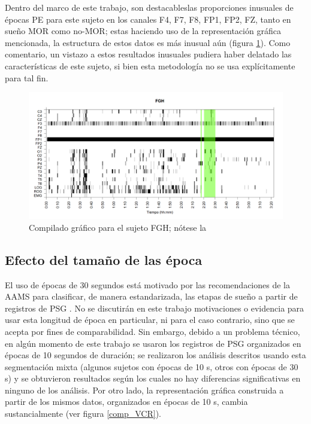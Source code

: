 \documentclass[12pt,a4paper]{mitthesis}
\begin{document}
Dentro del marco de este trabajo, son destacableslas proporciones inusuales de \'epocas PE para 
este sujeto en los canales F4, F7, F8, FP1, FP2, FZ, tanto en sue\~no MOR como no-MOR; estas 
haciendo uso de la representaci\'on gr\'afica mencionada, la estructura de estos datos es m\'as
inusual a\'un (figura \ref{FGH_especial}).
Como comentario, un vistazo a estos resultados inusuales pudiera haber delatado las 
caracter\'isticas de este sujeto, si bien esta metodolog\'ia no se usa expl\'icitamente para tal 
fin.

\begin{figure}
\centering
\includegraphics[width=0.95\linewidth]
{./muypreeliminar170408/FGHSUE_est.png} 
\caption{Compilado gr\'afico para el sujeto FGH; n\'otese la }
\label{FGH_especial}
\end{figure}


\subsection{Efecto del tama\~no de las \'epoca}

El uso de \'epocas de 30 segundos est\'a motivado por las recomendaciones de la AAMS para 
clasificar, de manera estandarizada, las etapas de sue\~no a partir de registros de PSG 
\cite{AASM07}. 
No se discutir\'an en este trabajo motivaciones o evidencia para usar esta longitud de \'epoca en 
particular, ni para el caso contrario, sino que se acepta por fines de comparabilidad. 
Sin embargo, debido a un problema t\'ecnico, en alg\'un momento de este trabajo se usaron los 
registros de PSG organizados en \'epocas de 10 segundos de duraci\'on; se realizaron los an\'alisis 
descritos usando esta segmentaci\'on mixta (algunos sujetos con \'epocas de 10 s, otros con 
\'epocas de 30 s) y se obtuvieron resultados seg\'un los cuales no hay diferencias significativas 
en ninguno de los an\'alisis. 
Por otro lado, la representaci\'on gr\'afica construida a partir de los mismos datos, organizados
en \'epocas de 10 s, cambia sustancialmente (ver figura \ref{comp_VCR}).
\end{document}
